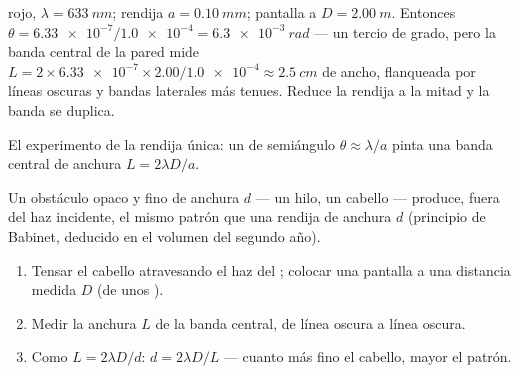 \begin{example}\label{ex:g12:light-as-wave:slit}
 rojo, $\lambda = \qty{633}{nm}$; rendija $a = \qty{0.10}{mm}$;
pantalla a $D = \qty{2.00}{m}$. Entonces
$\theta = \num{6.33e-7} / \num{1.0e-4} = \qty{6.3e-3}{rad}$ --- un
tercio de grado, pero la banda central de la pared mide
$L = 2 \times \num{6.33e-7} \times 2.00 / \num{1.0e-4} \approx
\qty{2.5}{cm}$ de ancho, flanqueada por líneas oscuras y bandas
laterales más tenues. Reduce la rendija a la mitad y la banda se
duplica.
\end{example}

\begin{omfigure}

{\small El experimento de la rendija única: un  de semiángulo
$\theta \approx \lambda/a$ pinta una banda central de anchura
$L = 2\lambda D/a$.}
\end{omfigure}

\begin{proposition}\label{prop:g12:light-as-wave:hair}
Un obstáculo opaco y fino de anchura $d$ --- un hilo, un cabello ---
produce, fuera del haz incidente, el mismo patrón que una rendija de
anchura $d$ (principio de Babinet, deducido en el volumen del segundo
año).
\end{proposition}
\admitted

\begin{method}\label{met:g12:light-as-wave:hairwidth}
\begin{enumerate}
  \item Tensar el cabello atravesando el haz del ; colocar una
        pantalla a una distancia medida $D$ (de unos ).
  \item Medir la anchura $L$ de la banda central, de línea oscura a
        línea oscura.
  \item Como $L = 2\lambda D/d$: $d = 2\lambda D/L$ --- cuanto más fino
        el cabello, mayor el patrón.
\end{enumerate}
\end{method}

